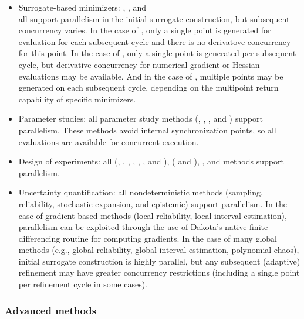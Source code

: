 \begin{itemize}
\item Surrogate-based minimizers: ,
  , and\\ 
  all support parallelism in the initial surrogate construction, but
  subsequent concurrency varies.  In the case of
  , only a single point is generated for
  evaluation for each subsequent cycle and there is no derivatove
  concurrency for this point.  In the case of
  , only a single point is generated
  per subsequent cycle, but derivative concurrency for numerical
  gradient or Hessian evaluations may be available.  And in the case
  of , multiple points may be
  generated on each subsequent cycle, depending on the multipoint
  return capability of specific minimizers.

\item Parameter studies: all parameter study methods (,
  , , and ) support
  parallelism. These methods avoid internal synchronization points, so
  all evaluations are available for concurrent execution.

\item Design of experiments: all  (,
  , , , ,
  , and ),
   ( and ),
  , and  methods support
  parallelism.

\item Uncertainty quantification: all nondeterministic methods
  (sampling, reliability, stochastic expansion, and epistemic) support
  parallelism. In the case of gradient-based methods (local
  reliability, local interval estimation), parallelism can be exploited
  through the use of Dakota's native finite differencing routine for
  computing gradients.  In the case of many global methods (e.g.,
  global reliability, global interval estimation, polynomial chaos),
  initial surrogate construction is highly parallel, but any subsequent
  (adaptive) refinement may have greater concurrency restrictions
  (including a single point per refinement cycle in some cases).
\end{itemize}

\subsubsection{Advanced methods}\label{parallel:algorithms:adv_meth}


